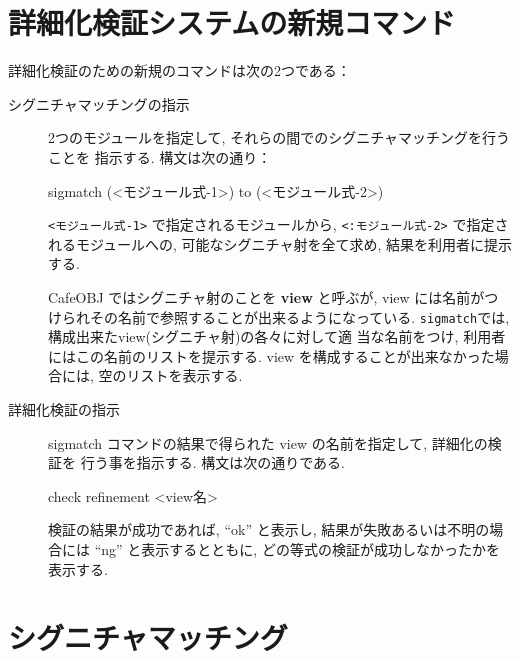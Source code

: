 \section{詳細化検証システムの新規コマンド}
\label{sec:spec-check-new-commands}

詳細化検証のための新規のコマンドは次の2つである：
\begin{description}
\item[シグニチャマッチングの指示]
  2つのモジュールを指定して, それらの間でのシグニチャマッチングを行うことを
  指示する. 構文は次の通り：

\begin{vvtm}
\begin{simplev}
  sigmatch (<モジュール式-1>) to (<モジュール式-2>)
\end{simplev}
\end{vvtm}

\texttt{<モジュール式-1>} で指定されるモジュールから,
\texttt{<:モジュール式-2>} で指定されるモジュールへの,
  可能なシグニチャ射を全て求め, 結果を利用者に提示する.

  CafeOBJ ではシグニチャ射のことを \textbf{view} と呼ぶが,
  view には名前がつけられその名前で参照することが出来るようになっている.
  \texttt{sigmatch}では, 構成出来たview(シグニチャ射)の各々に対して適
  当な名前をつけ, 
  利用者にはこの名前のリストを提示する. 
  view を構成することが出来なかった場合には, 空のリストを表示する.

\item[詳細化検証の指示]
  sigmatch コマンドの結果で得られた view の名前を指定して, 詳細化の検証を
  行う事を指示する. 構文は次の通りである.

\begin{vvtm}
\begin{simplev}
  check refinement <view名>
\end{simplev}
\end{vvtm}

検証の結果が成功であれば, ``ok'' と表示し, 結果が失敗あるいは不明の場合には
  ``ng'' と表示するとともに, どの等式の検証が成功しなかったかを表示する.

\end{description}

\section{シグニチャマッチング}
\label{spec:signature-matching-proc}

